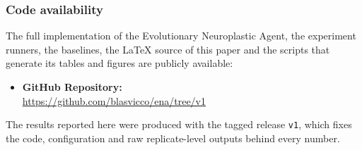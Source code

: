 \subsubsection*{Code availability}

The full implementation of the Evolutionary Neuroplastic Agent, the experiment runners, the baselines, the LaTeX source of this paper and the scripts that generate its tables and figures are publicly available:
\begin{itemize}
    \item \textbf{GitHub Repository:}\\ \url{https://github.com/blasvicco/ena/tree/v1}
\end{itemize}
The results reported here were produced with the tagged release \texttt{v1}, which fixes the code, configuration and raw replicate-level outputs behind every number.
